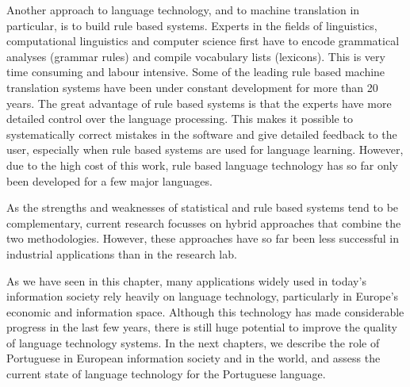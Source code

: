\begin{multicols}{2}
Another approach to language technology, and to machine translation in particular, is to build rule based systems. Experts in the fields of linguistics, computational linguistics and computer science first have to encode grammatical analyses (grammar rules) and compile vocabulary lists (lexicons). This is very time consuming and labour intensive. Some of the leading rule based machine translation systems have been under constant development for more than 20 years. The great advantage of rule based systems is that the experts have more detailed control over the language processing. This makes it possible to systematically correct mistakes in the software and give detailed feedback to the user, especially when rule based systems are used for language learning. However, due to the high cost of this work, rule based language technology has so far only been developed for a few major languages. 

As the strengths and weaknesses of statistical and rule based systems tend to be complementary, current research focusses on hybrid approaches that combine the two methodologies. However, these approaches have so far been less successful in industrial applications than in the research lab. 


As we have seen in this chapter, many applications widely used in today’s information society rely heavily on language technology, particularly in Europe’s economic and information space. Although this technology has made considerable progress in the last few years, there is still huge potential to improve the quality of language technology systems. In the next chapters, we describe the role of Portuguese in European information society and in the world, and assess the current state of language technology for the Portuguese language.
\end{multicols}

\clearpage


